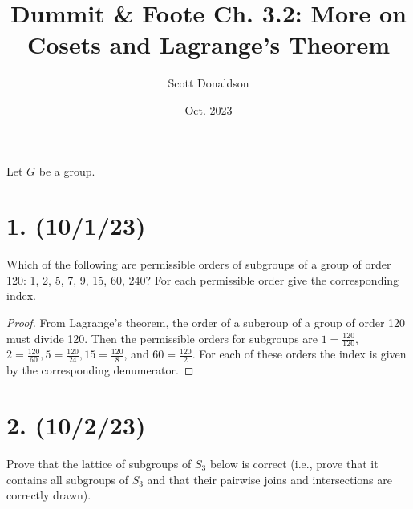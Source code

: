 \documentclass{article}
\title{Dummit \& Foote Ch. 3.2: More on Cosets and Lagrange's Theorem}
\author{Scott Donaldson}
\date{Oct. 2023}
\begin{document}
\maketitle

Let $G$ be a group.

\section*{1. (10/1/23)}

Which of the following are permissible orders of subgroups of a group of order 120: 1, 2, 5, 7, 9, 15, 60, 240? For each permissible order give the corresponding index.

\begin{proof}
    From Lagrange's theorem, the order of a subgroup of a group of order 120 must divide 120. Then the permissible orders for subgroups are $1 = \frac{120}{120}$, $2 = \frac{120}{60}, 5 = \frac{120}{24}, 15 = \frac{120}{8}$, and $60 = \frac{120}{2}$. For each of these orders the index is given by the corresponding denumerator.
\end{proof}

\section*{2. (10/2/23)}

Prove that the lattice of subgroups of $S_3$ below is correct (i.e., prove that it contains all subgroups of $S_3$ and that their pairwise joins and intersections are correctly drawn).

\begin{center}
\end{center}
\end{document}
